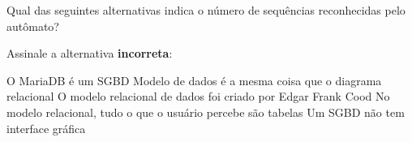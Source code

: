 \documentclass[12pt, addpoints]{exam}
\begin{document}
\begin{questions}
Qual das seguintes alternativas indica o número de sequências reconhecidas pelo autômato?
\begin{choices}
\end{choices}

\question Assinale a alternativa \textbf{incorreta}:
\begin{choices}
\choice O MariaDB é um SGBD
\choice Modelo de dados é a mesma coisa que o diagrama relacional
\choice O modelo relacional de dados foi criado por Edgar Frank Cood
\choice No modelo relacional, tudo o que o usuário percebe são tabelas
\choice Um SGBD não tem interface gráfica
\end{choices}



    \end{questions}
    
\end{document}
